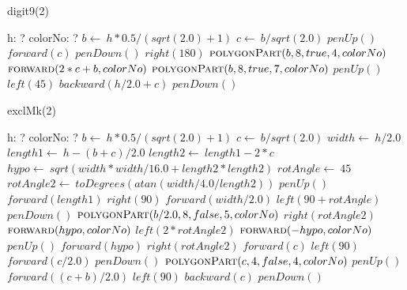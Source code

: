 \documentclass[a4paper,10pt]{article}
\begin{document}
\begin{algorithm}
\caption{digit9(2)}
\begin{algorithmic}[5]
\State {}
\State {}
    \State h: ?
    \State colorNo: ?
  \EndDecl
  \State \(b\gets\ h*0.5/(sqrt(2.0)+1)\)
  \State \(c\gets\ b/sqrt(2.0)\)
  \State \(penUp()\)
  \State \(forward(c)\)
  \State \(penDown()\)
  \State \(right(180)\)
  \State {}
  \State {}
  \State \(\Call{polygonPart}{b,8,true,4,colorNo}\)
  \State \(\Call{forward}{2*c+b,colorNo}\)
  \State {}
  \State {}
  \State \(\Call{polygonPart}{b,8,true,7,colorNo}\)
  \State \(penUp()\)
  \State \(left(45)\)
  \State \(backward(h/2.0+c)\)
  \State \(penDown()\)
\EndProcedure
\end{algorithmic}
\end{algorithm}


\begin{algorithm}
\caption{exclMk(2)}
\begin{algorithmic}[5]
\State {}
\State {}
    \State h: ?
    \State colorNo: ?
  \EndDecl
  \State \(b\gets\ h*0.5/(sqrt(2.0)+1)\)
  \State \(c\gets\ b/sqrt(2.0)\)
  \State \(width\gets\ h/2.0\)
  \State \(length1\gets\ h-(b+c)/2.0\)
  \State \(length2\gets\ length1-2*c\)
  \State \(hypo\gets\ sqrt(width*width/16.0+length2*length2)\)
  \State \(rotAngle\gets\ 45\)
  \State \(rotAngle2\gets\ toDegrees(atan(width/4.0/length2))\)
  \State \(penUp()\)
  \State \(forward(length1)\)
  \State \(right(90)\)
  \State \(forward(width/2.0)\)
  \State \(left(90+rotAngle)\)
  \State \(penDown()\)
  \State {}
  \State {}
  \State \(\Call{polygonPart}{b/2.0,8,false,5,colorNo}\)
  \State \(right(rotAngle2)\)
  \State \(\Call{forward}{hypo,colorNo}\)
  \State \(left(2*rotAngle2)\)
  \State \(\Call{forward}{-hypo,colorNo}\)
  \State \(penUp()\)
  \State \(forward(hypo)\)
  \State \(right(rotAngle2)\)
  \State \(forward(c)\)
  \State \(left(90)\)
  \State \(forward(c/2.0)\)
  \State \(penDown()\)
  \State {}
  \State {}
  \State \(\Call{polygonPart}{c,4,false,4,colorNo}\)
  \State \(penUp()\)
  \State \(forward((c+b)/2.0)\)
  \State \(left(90)\)
  \State \(backward(c)\)
  \State \(penDown()\)
\EndProcedure
\end{algorithmic}
\end{algorithm}
\end{document}
